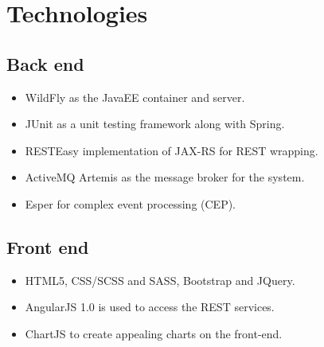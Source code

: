 \documentclass[11pt,a4paper]{article}
\begin{document}
%
	
\section{Technologies}
\subsection{Back end}
\begin{itemize}
	\item WildFly as the JavaEE container and server.
	\item JUnit as a unit testing framework along with Spring.
	\item RESTEasy implementation of JAX-RS for REST wrapping.
	\item ActiveMQ Artemis as the message broker for the system.
	\item Esper for complex event processing (CEP).
\end{itemize}
\subsection{Front end}
\begin{itemize}
	\item HTML5, CSS/SCSS and SASS, Bootstrap and JQuery.
	\item AngularJS 1.0 is used to access the REST services.
	\item ChartJS to create appealing charts on the front-end.
\end{itemize}
\end{document}
